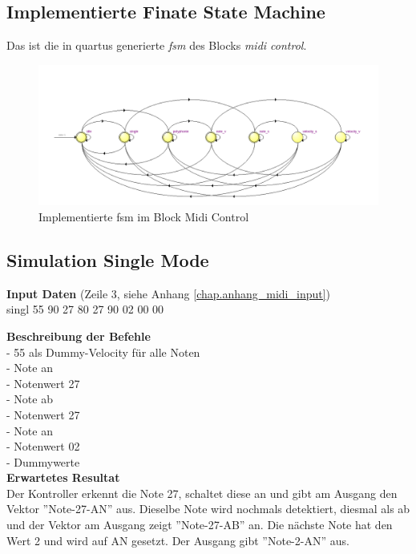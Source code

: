 \subsection{Implementierte Finate State Machine}
Das ist die in quartus generierte \textit{fsm} des Blocks \textit{midi control}.
\begin{figure}[H]
	\centering
	\includegraphics[width=1\textwidth]{images/midi_control/fsm_midicontrol.png}
	\caption{Implementierte fsm im Block Midi Control}
	\label{fig.midi_fsm_quartus_}
\end{figure}


\subsection{Simulation Single Mode}

\textbf{Input Daten} (Zeile 3, siehe Anhang \ref{chap.anhang_midi_input})\\
singl 55 90 27 80 27 90 02 00 00

\textbf{Beschreibung der Befehle}\\
- 55 als Dummy-Velocity für alle Noten\\
- Note an\\
- Notenwert 27\\
- Note ab\\
- Notenwert 27\\
- Note an\\
- Notenwert 02\\
- Dummywerte\\

\textbf{Erwartetes Resultat}\\
Der Kontroller erkennt die Note 27, schaltet diese an und gibt am Ausgang den Vektor ''Note-27-AN'' aus. Dieselbe Note wird nochmals detektiert, diesmal als ab und der Vektor am Ausgang zeigt ''Note-27-AB'' an. Die nächste Note hat den Wert 2 und wird auf AN gesetzt. Der Ausgang gibt ''Note-2-AN'' aus.\\


